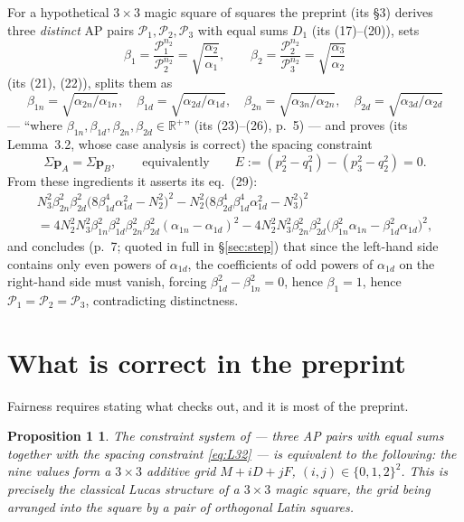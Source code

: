 \documentclass[11pt]{amsart}
\newtheorem*{propone}{Proposition 1}
\theoremstyle{remark}
\newcommand{\R}{\mathbb{R}}
\newcommand{\cP}{\mathcal{P}}
\begin{document}
For a hypothetical $3\times 3$ magic square of squares the preprint
(its \S3) derives three \emph{distinct} AP pairs $\cP_1, \cP_2, \cP_3$
with equal sums $D_1$ (its (17)--(20)), sets
\begin{equation*}
\beta_1 = \frac{\cP_1^{n_2}}{\cP_2^{n_2}} = \sqrt{\frac{\alpha_2}{\alpha_1}},
\qquad
\beta_2 = \frac{\cP_2^{n_2}}{\cP_3^{n_2}} = \sqrt{\frac{\alpha_3}{\alpha_2}}
\end{equation*}
(its (21), (22)), splits them as
\begin{equation*}
\beta_{1n} = \sqrt{\alpha_{2n}/\alpha_{1n}}, \quad
\beta_{1d} = \sqrt{\alpha_{2d}/\alpha_{1d}}, \quad
\beta_{2n} = \sqrt{\alpha_{3n}/\alpha_{2n}}, \quad
\beta_{2d} = \sqrt{\alpha_{3d}/\alpha_{2d}}
\end{equation*}
--- ``where $\beta_{1n}, \beta_{1d}, \beta_{2n}, \beta_{2d} \in
\R^+$'' (its (23)--(26), p.~5) --- and proves (its Lemma~3.2, whose
case analysis is correct) the spacing constraint
\begin{equation}\label{eq:L32}
\Sigma\mathbf{p}_A = \Sigma\mathbf{p}_B,
\qquad\text{equivalently}\qquad
E := (p_2^2 - q_1^2) - (p_3^2 - q_2^2) = 0.
\tag{L3.2}
\end{equation}
From these ingredients it asserts its eq.~(29):
\begin{multline}
N_3^2\beta_{2n}^2\beta_{2d}^2\bigl(8\beta_{1d}^4\alpha_{1d}^2 - N_2^2\bigr)^2
 - N_2^2\bigl(8\beta_{2d}^4\beta_{1d}^4\alpha_{1d}^2 - N_3^2\bigr)^2 \\
 = 4N_2^2N_3^2\beta_{1n}^2\beta_{1d}^2\beta_{2n}^2\beta_{2d}^2
   (\alpha_{1n}-\alpha_{1d})^2
 - 4N_2^2N_3^2\beta_{2n}^2\beta_{2d}^2
   \bigl(\beta_{1n}^2\alpha_{1n}-\beta_{1d}^2\alpha_{1d}\bigr)^2,
\tag{29}
\end{multline}
and concludes (p.~7; quoted in full in \S\ref{sec:step}) that since the
left-hand side contains only even powers of $\alpha_{1d}$, the
coefficients of odd powers of $\alpha_{1d}$ on the right-hand side must
vanish, forcing $\beta_{1d}^2 - \beta_{1n}^2 = 0$, hence $\beta_1 = 1$,
hence $\cP_1 = \cP_2 = \cP_3$, contradicting distinctness.

\section{What is correct in the preprint}\label{sec:correct}

Fairness requires stating what checks out, and it is most of the
preprint.

\begin{propone}
The constraint system of \cite{Hill} --- three AP pairs with equal sums
together with the spacing constraint \eqref{eq:L32} --- is equivalent
to the following: the nine values form a $3\times 3$ additive grid
$M + iD + jF$, $(i,j) \in \{0,1,2\}^2$. This is precisely the
classical Lucas structure of a $3\times 3$ magic square, the grid being
arranged into the square by a pair of orthogonal Latin squares.
\end{propone}
\end{document}
